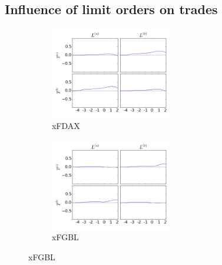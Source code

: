 \documentclass[a4paper,11pt]{article}
\begin{document}
\subsection{Influence of limit orders on trades}
\label{LT}
\begin{figure}[H]
        \begin{subfigure}[b]{0.45\textwidth}
                \includegraphics[width=\textwidth,height=40mm]{xFDAXPA_PB_TA_TB_LA_LB_CA_CB__LALB-_TATBcausality.png}
                \caption{xFDAX}
        \end{subfigure}
        \begin{subfigure}[b]{0.45\textwidth}
                \includegraphics[width=\textwidth,height=40mm]{xFGBLPA_PB_TA_TB_LA_LB_CA_CB__LALB-_TATBcausality.png}
                \caption{xFGBL}
        \end{subfigure}
\end{figure}
\end{document}
